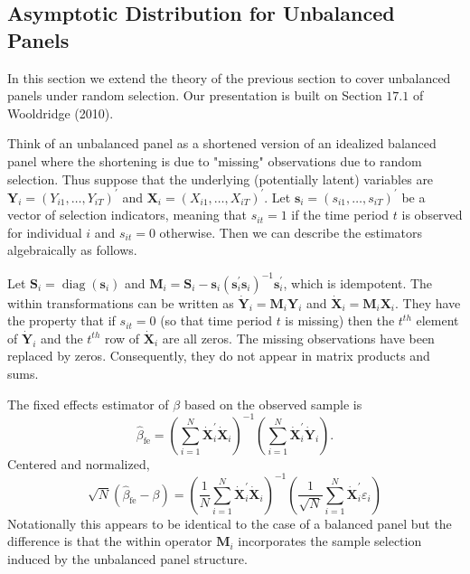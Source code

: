 \documentclass[10pt]{article}
\begin{document}
\subsection{Asymptotic Distribution for Unbalanced Panels}
In this section we extend the theory of the previous section to cover unbalanced panels under random selection. Our presentation is built on Section $17.1$ of Wooldridge (2010).

Think of an unbalanced panel as a shortened version of an idealized balanced panel where the shortening is due to "missing" observations due to random selection. Thus suppose that the underlying (potentially latent) variables are $\boldsymbol{Y}_{i}=\left(Y_{i 1}, \ldots, Y_{i T}\right)^{\prime}$ and $\boldsymbol{X}_{i}=\left(X_{i 1}, \ldots, X_{i T}\right)^{\prime}$. Let $\boldsymbol{s}_{i}=\left(s_{i 1}, \ldots, s_{i T}\right)^{\prime}$ be a vector of selection indicators, meaning that $s_{i t}=1$ if the time period $t$ is observed for individual $i$ and $s_{i t}=0$ otherwise. Then we can describe the estimators algebraically as follows.

Let $\boldsymbol{S}_{i}=\operatorname{diag}\left(\boldsymbol{s}_{i}\right)$ and $\boldsymbol{M}_{i}=\boldsymbol{S}_{i}-\boldsymbol{s}_{i}\left(\boldsymbol{s}_{i}^{\prime} \boldsymbol{s}_{i}\right)^{-1} \boldsymbol{s}_{i}^{\prime}$, which is idempotent. The within transformations can be written as $\dot{\boldsymbol{Y}}_{i}=\boldsymbol{M}_{i} \boldsymbol{Y}_{i}$ and $\dot{\boldsymbol{X}}_{i}=\boldsymbol{M}_{i} \boldsymbol{X}_{i}$. They have the property that if $s_{i t}=0$ (so that time period $t$ is missing) then the $t^{t h}$ element of $\dot{\boldsymbol{Y}}_{i}$ and the $t^{t h}$ row of $\dot{\boldsymbol{X}}_{i}$ are all zeros. The missing observations have been replaced by zeros. Consequently, they do not appear in matrix products and sums.

The fixed effects estimator of $\beta$ based on the observed sample is
$$
\widehat{\beta}_{\mathrm{fe}}=\left(\sum_{i=1}^{N} \dot{\boldsymbol{X}}_{i}^{\prime} \dot{\boldsymbol{X}}_{i}\right)^{-1}\left(\sum_{i=1}^{N} \dot{\boldsymbol{X}}_{i}^{\prime} \dot{\boldsymbol{Y}}_{i}\right) .
$$
Centered and normalized,
$$
\sqrt{N}\left(\widehat{\beta}_{\mathrm{fe}}-\beta\right)=\left(\frac{1}{N} \sum_{i=1}^{N} \dot{\boldsymbol{X}}_{i}^{\prime} \dot{\boldsymbol{X}}_{i}\right)^{-1}\left(\frac{1}{\sqrt{N}} \sum_{i=1}^{N} \dot{\boldsymbol{X}}_{i}^{\prime} \varepsilon_{i}\right)
$$
Notationally this appears to be identical to the case of a balanced panel but the difference is that the within operator $\boldsymbol{M}_{i}$ incorporates the sample selection induced by the unbalanced panel structure.
\end{document}
